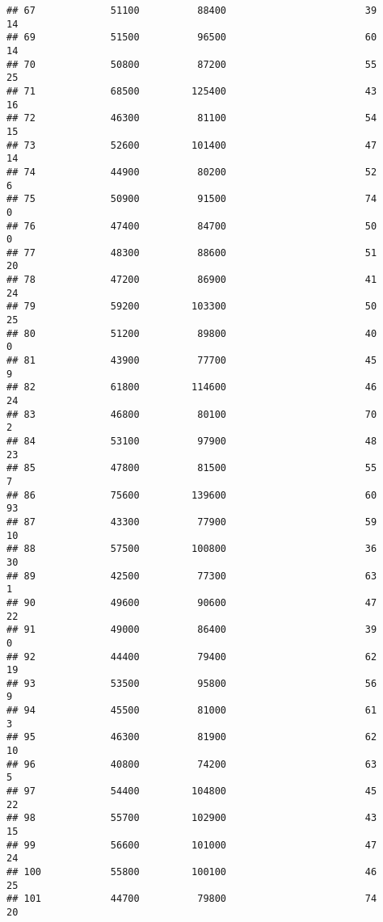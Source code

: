 \documentclass[
]{article}
\begin{document}
\begin{verbatim}
## 67             51100          88400                        39           14
## 69             51500          96500                        60           14
## 70             50800          87200                        55           25
## 71             68500         125400                        43           16
## 72             46300          81100                        54           15
## 73             52600         101400                        47           14
## 74             44900          80200                        52            6
## 75             50900          91500                        74            0
## 76             47400          84700                        50            0
## 77             48300          88600                        51           20
## 78             47200          86900                        41           24
## 79             59200         103300                        50           25
## 80             51200          89800                        40            0
## 81             43900          77700                        45            9
## 82             61800         114600                        46           24
## 83             46800          80100                        70            2
## 84             53100          97900                        48           23
## 85             47800          81500                        55            7
## 86             75600         139600                        60           93
## 87             43300          77900                        59           10
## 88             57500         100800                        36           30
## 89             42500          77300                        63            1
## 90             49600          90600                        47           22
## 91             49000          86400                        39            0
## 92             44400          79400                        62           19
## 93             53500          95800                        56            9
## 94             45500          81000                        61            3
## 95             46300          81900                        62           10
## 96             40800          74200                        63            5
## 97             54400         104800                        45           22
## 98             55700         102900                        43           15
## 99             56600         101000                        47           24
## 100            55800         100100                        46           25
## 101            44700          79800                        74           20

\end{verbatim}
\end{document}
